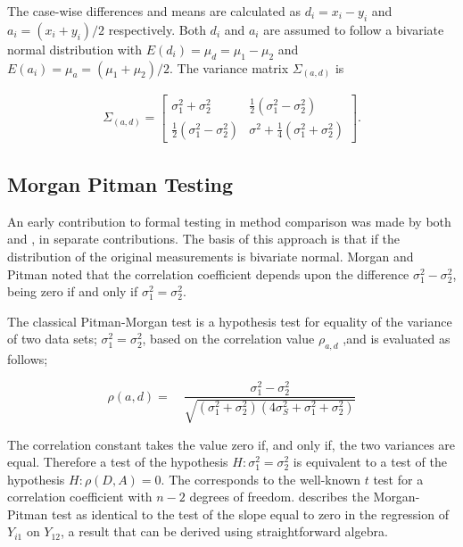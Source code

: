 \documentclass[12pt, a4paper]{report}
\theoremstyle{plain}
\theoremstyle{definition}
\theoremstyle{remark}
\begin{document}

The case-wise differences and means are calculated as $d_{i} =
x_{i}-y_{i}$ and $a_{i} = (x_{i}+y_{i})/2$  respectively. Both
$d_{i}$ and $a_{i}$ are assumed to follow a bivariate normal
distribution with $E(d_{i})= \mu_{d} = \mu_{1} - \mu_{2}$ and
$E(a_{i})= \mu_{a} = (\mu_{1} + \mu_{2})/2$. The variance matrix
$\Sigma_{(a,d)}$ is

\begin{eqnarray}
\Sigma_{(a,d)}= \left[\begin{matrix}
\sigma^{2}_{1}+\sigma^{2}_{2}&\frac{1}{2}(\sigma^{2}_{1}-\sigma^{2}_{2})\\
\frac{1}{2}(\sigma^{2}_{1}-\sigma^{2}_{2})&\sigma^{2}+
\frac{1}{4}(\sigma^{2}_{1}+\sigma^{2}_{2})
\end{matrix} \right].
\end{eqnarray}



\subsection{Morgan Pitman Testing}
An early contribution to formal testing in method comparison was
made by both \citet{morgan} and \citet{pitman}, in separate
contributions. The basis of this approach is that if the
distribution of the original measurements is bivariate normal.
Morgan and Pitman noted that the correlation coefficient depends
upon the difference $\sigma^{2}_{1}- \sigma^{2}_{2}$, being zero
if and only if $\sigma^{2}_{1}=\sigma^{2}_{2}$.

The classical Pitman-Morgan test is a hypothesis test for equality
of the variance of two data sets; $\sigma^{2}_{1} =
\sigma^{2}_{2}$, based on the correlation value $\rho_{a,d}$ ,and
is evaluated as follows;

\begin{equation}
\rho(a,d)=\quad\frac{\sigma^{2}_{1}-\sigma^{2}_{2}}{\sqrt{(\sigma^{2}_{1}+\sigma^{2}_{2})(4\sigma^{2}_{S}+\sigma^{2}_{1}+\sigma^{2}_{2})}}
\end{equation}

The correlation constant takes the value zero if, and only if, the two variances are equal. Therefore a test of the hypothesis $H: \sigma^{2}_{1}=\sigma^{2}_{2}$ is equivalent to a test of the hypothesis $H: \rho(D,A) = 0$. The corresponds to the well-known
$t$ test for a correlation coefficient with $n-2$ degrees of freedom. \citet{Bartko} describes the Morgan-Pitman test as identical to
the test of the slope equal to zero in the regression of $Y_{i1}$ on $Y_{12}$, a result that can be derived using
straightforward algebra.
\end{document}
